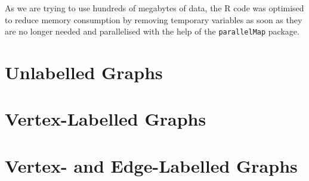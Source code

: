 \documentclass{l4proj}
\theoremstyle{definition}
\theoremstyle{remark}
\begin{document}
As we are trying to use hundreds of megabytes of data, the R code was optimised
to reduce memory consumption by removing temporary variables as soon as they are
no longer needed and parallelised with the help of the \texttt{parallelMap}
package.

\section{Unlabelled Graphs}
\section{Vertex-Labelled Graphs}

\section{Vertex- and Edge-Labelled Graphs}




\end{document}
